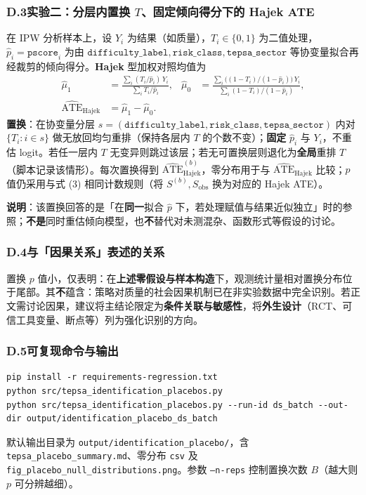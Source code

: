 \subsubsection{D.3\quad 实验二：分层内置换 \(T\)、固定倾向得分下的 Hajek ATE}

在 IPW 分析样本上，设 \(Y_i\) 为结果（如质量），\(T_i\in\{0,1\}\) 为二值处理，\(\hat p_i=\texttt{pscore}_i\) 为由 \(\texttt{difficulty\_label},\texttt{risk\_class},\texttt{tepsa\_sector}\) 等协变量拟合再经裁剪的倾向得分。\textbf{Hajek} 型加权对照均值为
\begin{align}
\hat\mu_1 &= \frac{\sum_i (T_i/\hat p_i)\,Y_i}{\sum_i T_i/\hat p_i}, &
\hat\mu_0 &= \frac{\sum_i \bigl((1-T_i)/(1-\hat p_i)\bigr)\,Y_i}{\sum_i (1-T_i)/(1-\hat p_i)}, \\
\widehat{\mathrm{ATE}}_{\mathrm{Hajek}} &= \hat\mu_1 - \hat\mu_0.
\end{align}
\textbf{置换}：在协变量分层 \(s=(\texttt{difficulty\_label},\texttt{risk\_class},\texttt{tepsa\_sector})\) 内对 \(\{T_i:i\in s\}\) 做无放回均匀重排（保持各层内 \(T\) 的个数不变）；\textbf{固定} \(\hat p_i\) 与 \(Y_i\)，不重估 logit。若任一层内 \(T\) 无变异则跳过该层；若无可置换层则退化为\textbf{全局}重排 \(T\)（脚本记录该情形）。每次置换得到 \(\widehat{\mathrm{ATE}}_{\mathrm{Hajek}}^{(b)}\)，零分布用于与 \(\widehat{\mathrm{ATE}}_{\mathrm{Hajek}}\) 比较；\(p\) 值仍采用与式 (3) 相同计数规则（将 \(S^{(b)},S_{\mathrm{obs}}\) 换为对应的 Hajek ATE）。

\textbf{说明}：该置换回答的是「在\textbf{同一}拟合 \(\hat p\) 下，若处理赋值与结果近似独立」时的参照；\textbf{不是}同时重估倾向模型，也\textbf{不}替代对未测混杂、函数形式等假设的讨论。

\subsubsection{D.4\quad 与「因果关系」表述的关系}

置换 \(p\) 值小，仅表明：在\textbf{上述零假设与样本构造}下，观测统计量相对置换分布位于尾部。其\textbf{不}蕴含：策略对质量的社会因果机制已在非实验数据中完全识别。若正文需讨论因果，建议将主结论限定为\textbf{条件关联与敏感性}，将\textbf{外生设计}（RCT、可信工具变量、断点等）列为强化识别的方向。

\subsubsection{D.5\quad 可复现命令与输出}

\begin{verbatim}
pip install -r requirements-regression.txt
python src/tepsa_identification_placebos.py
python src/tepsa_identification_placebos.py --run-id ds_batch --out-dir output/identification_placebo_ds_batch
\end{verbatim}
默认输出目录为 \texttt{output/identification\_placebo/}，含 \texttt{tepsa\_placebo\_summary.md}、零分布 \texttt{csv} 及 \texttt{fig\_placebo\_null\_distributions.png}。参数 \texttt{--n-reps} 控制置换次数 \(B\)（越大则 \(p\) 可分辨越细）。
